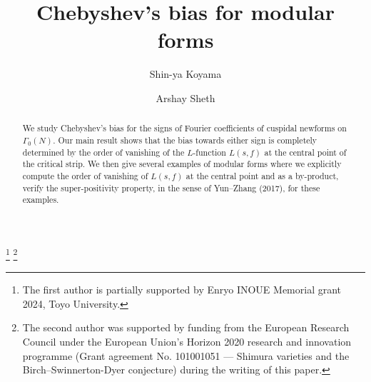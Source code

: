 \documentclass[12pt,reqno]{amsart}
\theoremstyle{definition}
\numberwithin{equation}{section}
\begin{document}
\title{Chebyshev's bias for modular forms}



\author{Shin-ya Koyama}
\address[Shin-ya Koyama]{Department of Mechanical Engineering, Toyo University, 2100 Kujirai, Kawagoe, Saitama, 350-8585, Japan}

\author{Arshay Sheth}
\address[Arshay Sheth]{Mathematics Institute, Zeeman Building, University of Warwick, Coventry, CV4 7AL, United Kingdom }


\thanks{The first author is partially supported by Enryo INOUE Memorial grant 2024, Toyo University.}
\thanks{The second author was supported by funding from the European Research Council under the European Union’s Horizon 2020 research and innovation programme (Grant agreement No. 101001051 — Shimura varieties and the Birch--Swinnerton-Dyer conjecture) during the writing of this paper.}









\keywords{}







\begin{abstract}
We study Chebyshev's bias for the signs of Fourier coefficients of cuspidal newforms on $\Gamma_0(N)$. Our main result shows that the bias towards either sign is completely determined by the order of vanishing of the $L$-function $L(s, f)$ at the central point of the critical strip.  We then give several examples of modular forms where we explicitly compute the order of vanishing of $L(s, f)$ at the central point and as a by-product, verify the super-positivity property, in the sense of Yun--Zhang (2017), for these examples. 
\end{abstract}





\maketitle
\end{document}
